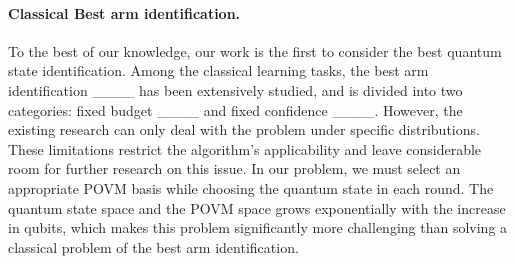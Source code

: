 \paragraph{Classical Best arm identification.} To the best of our knowledge, our work is the first to consider the best quantum state identification. Among the classical learning tasks, the best arm identification ____ has been extensively studied, and is divided into two categories: fixed budget ____ and fixed confidence ____. However, the existing research can only deal with the problem under specific distributions. %
These limitations restrict the algorithm's applicability and leave considerable room for further research on this issue. In our problem, we must select an appropriate POVM basis while choosing the quantum state in each round. The quantum state space and the POVM space grows exponentially with the increase in qubits, which makes this problem significantly more challenging than solving a classical problem of the best arm identification.